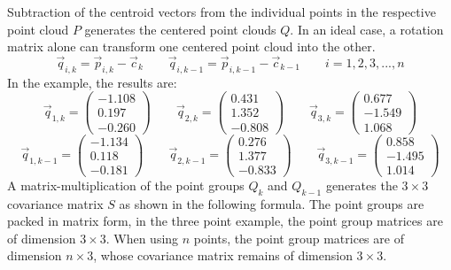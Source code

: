 Subtraction of the centroid vectors from the individual points in the respective point cloud $P$ generates the centered point clouds $Q$. In an ideal case, a rotation matrix alone can transform one centered point cloud into the other. 
\begin{equation*}
    \vec{q}_{i,k}=\vec{p}_{i,k}-\vec{c}_{k} \qquad 
    \vec{q}_{i,k-1}=\vec{p}_{i,k-1}-\vec{c}_{k-1} \qquad i = 1, 2, 3, ... , n
\end{equation*}
In the example, the results are:
\begin{equation*}
    \vec{q}_{1,k}=
    \begin{pmatrix}
        -1.108 \\
        0.197 \\
        -0.260
    \end{pmatrix}
    \qquad 
    \vec{q}_{2,k}=
    \begin{pmatrix}
        0.431 \\
        1.352 \\
        -0.808
    \end{pmatrix}
    \qquad     \vec{q}_{3,k}=
    \begin{pmatrix}
        0.677 \\
        -1.549 \\
        1.068
    \end{pmatrix}
\end{equation*}
\begin{equation*}
    \vec{q}_{1,k-1}=
    \begin{pmatrix}
        -1.134 \\
        0.118 \\
        -0.181
    \end{pmatrix}
    \qquad 
    \vec{q}_{2,k-1}=
    \begin{pmatrix}
        0.276 \\
        1.377 \\
        -0.833
    \end{pmatrix}
    \qquad     \vec{q}_{3,k-1}=
    \begin{pmatrix}
        0.858 \\
        -1.495 \\
        1.014
    \end{pmatrix}
\end{equation*}
A matrix-multiplication of the point groups $Q_{k}$ and $Q_{k-1}$ generates the $3\times3$ covariance matrix $S$ as shown in the following formula. The point groups are packed in matrix form, in the three point example, the point group matrices are of dimension $3\times3$. When using $n$ points, the point group matrices are of dimension $n\times3$, whose covariance matrix remains of dimension $3\times3$.
